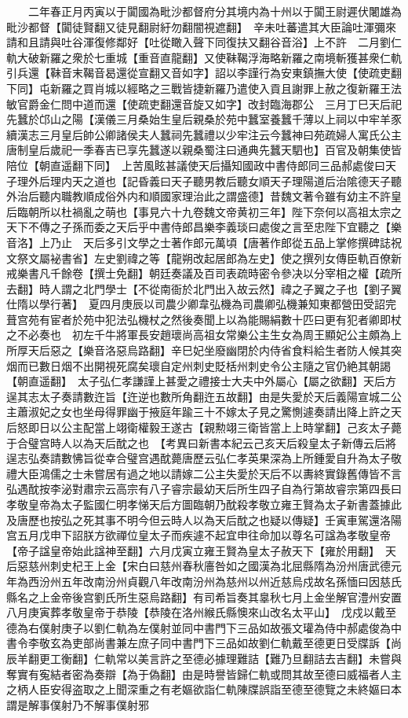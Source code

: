 　　二年春正月丙寅以于闐國為毗沙都督府分其境内為十州以于闐王尉遲伏闍雄為毗沙都督【闐徒賢翻又徒見翻尉紆勿翻闇視遮翻】　辛未吐蕃遣其大臣論吐渾彌來請和且請與吐谷渾復修鄰好【吐從瞰入聲下同復扶又翻谷音浴】上不許　二月劉仁軌大破新羅之衆於七重城【重音直龍翻】又使靺鞨浮海略新羅之南境斬獲甚衆仁軌引兵還【靺音末鞨音曷還從宣翻又音如字】詔以李謹行為安東鎮撫大使【使疏吏翻下同】屯新羅之買肖城以經略之三戰皆捷新羅乃遣使入貢且謝罪上赦之復新羅王法敏官爵金仁問中道而還【使疏吏翻還音旋又如字】改封臨海郡公　三月丁巳天后祀先蠶於邙山之陽【漢儀三月桑始生皇后親桑於苑中蠶室養蠶千薄以上祠以中牢羊豕續漢志三月皇后帥公卿諸侯夫人蠶祠先蠶禮以少牢注云今蠶神曰苑疏婦人寓氏公主唐制皇后歲祀一季春吉已享先蠶遂以親桑蜀注曰通典先蠶天駟也】百官及朝集使皆陪位【朝直遥翻下同】　上苦風眩甚議使天后攝知國政中書侍郎同三品郝處俊曰天子理外后理内天之道也【記昏義曰天子聽男教后聽女順天子理陽道后治隂德天子聽外治后聽内職教順成俗外内和順國家理治此之謂盛德】昔魏文著令雖有幼主不許皇后臨朝所以杜禍亂之萌也【事見六十九卷魏文帝黄初三年】陛下奈何以高祖太宗之天下不傳之子孫而委之天后乎中書侍郎昌樂李義琰曰處俊之言至忠陛下宜聽之【樂音洛】上乃止　天后多引文學之士著作郎元萬頃【唐著作郎從五品上掌修撰碑誌祝文祭文屬袐書省】左史劉禕之等【龍朔改起居郎為左史】使之撰列女傳臣軌百僚新戒樂書凡千餘卷【撰士免翻】朝廷奏議及百司表疏時密令參决以分宰相之權【疏所去翻】時人謂之北門學士【不從南衙於北門出入故云然】禕之子翼之子也【劉子翼仕隋以學行著】　夏四月庚辰以司農少卿韋弘機為司農卿弘機兼知東都營田受詔完葺宫苑有宦者於苑中犯法弘機杖之然後奏聞上以為能賜絹數十匹曰更有犯者卿即杖之不必奏也　初左千牛將軍長安趙瓌尚高祖女常樂公主生女為周王顯妃公主頗為上所厚天后惡之【樂音洛惡烏路翻】辛巳妃坐廢幽閉於内侍省食料給生者防人候其突烟而已數日烟不出開視死腐矣瓌自定州刺史貶栝州刺史令公主隨之官仍絶其朝謁【朝直遥翻】　太子弘仁孝謙謹上甚愛之禮接士大夫中外屬心【屬之欲翻】天后方逞其志太子奏請數迕旨【迕逆也數所角翻迕五故翻】由是失愛於天后義陽宣城二公主蕭淑妃之女也坐母得罪幽于掖庭年踰三十不嫁太子見之驚惻遽奏請出降上許之天后怒即日以公主配當上翊衛權毅王遂古【親勲翊三衛皆當上上時掌翻】己亥太子薨于合璧宫時人以為天后酖之也　【考異曰新書本紀云己亥天后殺皇太子新傳云后將逞志弘奏請數怫旨從幸合璧宫遇酖薨唐歷云弘仁孝英果深為上所鍾愛自升為太子敬禮大臣鴻儒之士未嘗居有過之地以請嫁二公主失愛於天后不以夀終實錄舊傳皆不言弘遇酖按李泌對肅宗云高宗有八子睿宗最幼天后所生四子自為行第故睿宗第四長曰孝敬皇帝為太子監國仁明孝悌天后方圖臨朝乃酖殺孝敬立雍王賢為太子新書蓋據此及唐歷也按弘之死其事不明今但云時人以為天后酖之也疑以傳疑】壬寅車駕還洛陽宫五月戊申下詔朕方欲禪位皇太子而疾遽不起宜申往命加以尊名可諡為孝敬皇帝【帝子諡皇帝始此諡神至翻】六月戊寅立雍王賢為皇太子赦天下【雍於用翻】　天后惡慈州刺史杞王上金【宋白曰慈州春秋廧咎如之國漢為北屈縣隋為汾州唐武德元年為西汾州五年改南汾州貞觀八年改南汾州為慈州以州近慈烏戍故名孫愐曰因慈氏縣名之上金帝後宫劉氏所生惡烏路翻】有司希旨奏其辠秋七月上金坐解官澧州安置　八月庚寅葬孝敬皇帝于恭陵【恭陵在洛州緱氏縣懊來山改名太平山】　戊戍以戴至德為右僕射庚子以劉仁軌為左僕射並同中書門下三品如故張文瓘為侍中郝處俊為中書令李敬玄為吏部尚書兼左庶子同中書門下三品如故劉仁軌戴至德更日受牒訴【尚辰羊翻更工衡翻】仁軌常以美言許之至德必據理難詰【難乃旦翻詰去吉翻】未嘗與奪實有寃結者密為奏辯【為于偽翻】由是時譽皆歸仁軌或問其故至德曰威福者人主之柄人臣安得盗取之上聞深重之有老嫗欲詣仁軌陳牒誤詣至德至德覽之未終嫗曰本謂是解事僕射乃不解事僕射邪